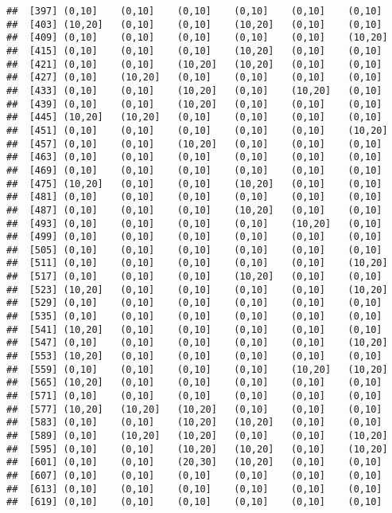 \documentclass[]{article}
\begin{document}
\begin{verbatim}
##  [397] (0,10]    (0,10]    (0,10]    (0,10]    (0,10]    (0,10]   
##  [403] (10,20]   (0,10]    (0,10]    (10,20]   (0,10]    (0,10]   
##  [409] (0,10]    (0,10]    (0,10]    (0,10]    (0,10]    (10,20]  
##  [415] (0,10]    (0,10]    (0,10]    (10,20]   (0,10]    (0,10]   
##  [421] (0,10]    (0,10]    (10,20]   (10,20]   (0,10]    (0,10]   
##  [427] (0,10]    (10,20]   (0,10]    (0,10]    (0,10]    (0,10]   
##  [433] (0,10]    (0,10]    (10,20]   (0,10]    (10,20]   (0,10]   
##  [439] (0,10]    (0,10]    (10,20]   (0,10]    (0,10]    (0,10]   
##  [445] (10,20]   (10,20]   (0,10]    (0,10]    (0,10]    (0,10]   
##  [451] (0,10]    (0,10]    (0,10]    (0,10]    (0,10]    (10,20]  
##  [457] (0,10]    (0,10]    (10,20]   (0,10]    (0,10]    (0,10]   
##  [463] (0,10]    (0,10]    (0,10]    (0,10]    (0,10]    (0,10]   
##  [469] (0,10]    (0,10]    (0,10]    (0,10]    (0,10]    (0,10]   
##  [475] (10,20]   (0,10]    (0,10]    (10,20]   (0,10]    (0,10]   
##  [481] (0,10]    (0,10]    (0,10]    (0,10]    (0,10]    (0,10]   
##  [487] (0,10]    (0,10]    (0,10]    (10,20]   (0,10]    (0,10]   
##  [493] (0,10]    (0,10]    (0,10]    (0,10]    (10,20]   (0,10]   
##  [499] (0,10]    (0,10]    (0,10]    (0,10]    (0,10]    (0,10]   
##  [505] (0,10]    (0,10]    (0,10]    (0,10]    (0,10]    (0,10]   
##  [511] (0,10]    (0,10]    (0,10]    (0,10]    (0,10]    (10,20]  
##  [517] (0,10]    (0,10]    (0,10]    (10,20]   (0,10]    (0,10]   
##  [523] (10,20]   (0,10]    (0,10]    (0,10]    (0,10]    (10,20]  
##  [529] (0,10]    (0,10]    (0,10]    (0,10]    (0,10]    (0,10]   
##  [535] (0,10]    (0,10]    (0,10]    (0,10]    (0,10]    (0,10]   
##  [541] (10,20]   (0,10]    (0,10]    (0,10]    (0,10]    (0,10]   
##  [547] (0,10]    (0,10]    (0,10]    (0,10]    (0,10]    (10,20]  
##  [553] (10,20]   (0,10]    (0,10]    (0,10]    (0,10]    (0,10]   
##  [559] (0,10]    (0,10]    (0,10]    (0,10]    (10,20]   (10,20]  
##  [565] (10,20]   (0,10]    (0,10]    (0,10]    (0,10]    (0,10]   
##  [571] (0,10]    (0,10]    (0,10]    (0,10]    (0,10]    (0,10]   
##  [577] (10,20]   (10,20]   (10,20]   (0,10]    (0,10]    (0,10]   
##  [583] (0,10]    (0,10]    (10,20]   (10,20]   (0,10]    (0,10]   
##  [589] (0,10]    (10,20]   (10,20]   (0,10]    (0,10]    (10,20]  
##  [595] (0,10]    (0,10]    (10,20]   (10,20]   (0,10]    (10,20]  
##  [601] (0,10]    (0,10]    (20,30]   (10,20]   (0,10]    (0,10]   
##  [607] (0,10]    (0,10]    (0,10]    (0,10]    (0,10]    (0,10]   
##  [613] (0,10]    (0,10]    (0,10]    (0,10]    (0,10]    (0,10]   
##  [619] (0,10]    (0,10]    (0,10]    (0,10]    (0,10]    (0,10]   

\end{verbatim}
\end{document}
